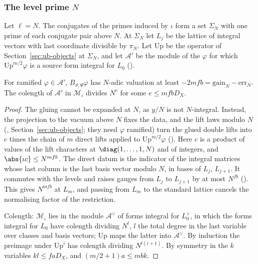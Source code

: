 \subsubsection{The level prime $N$}
Let $\ell=N$. The conjugates of the primes induced by $\iota$ form a set $\Sigma_N$ with one prime of
each conjugate pair above $N$. At $\Sigma_N$ let $L_j$ be the lattice of integral vectors with last
coordinate divisible by $\pi_N$. Let $\mathrm{Up}$ be the operator of Section~\ref{sec:ub-objects} at
$\Sigma_N$, and let $\mathcal A'$ be the module of the $\varphi$ for which
$\mathrm{Up}^{m/2}\varphi$ is a source form integral for $L_0$ ().

\begin{proposition}
\label{ub-divis:prop:N}
For ramified $\varphi\in\mathcal A'$, $B_{\vartheta,\Psi}\varphi$ has $N$-adic valuation at least
$-2mfb=\mathrm{gain}_N-\mathrm{err}_N$. The colength of $\mathcal A'$ in $\mathcal M_\iota$ divides
$N^e$ for some $e\le mfbD_X$.
\end{proposition}

\begin{proof}
The gluing cannot be expanded at $N$, as $y/N$ is not $N$-integral. Instead, the projection to the
vacuum above $N$ fixes the data, and the lift laws modulo $N$ (,
Section~\ref{sec:ub-objects}; they need $\varphi$ ramified) turn the glued double lifts into $c$
times the chain of $m$ direct lifts applied to $\mathrm{Up}^{m/2}\varphi$
(). Here $c$ is a product of
values of the lift characters at $\diag(1,\dots,1,N)$ and of integers, and $\abs{\iota c}\le N^{mfb}$. The direct
datum is the indicator of the integral matrices whose last column is the last basis vector modulo
$N$, in bases of $L_j$, $L_{j+1}$. It commutes with the levels and raises gauges from $L_j$ to
$L_{j+1}$ by at most $N^{fb}$ (). This gives
$N^{mfb}$ at $L_m$, and passing from $L_m$ to the standard lattice cancels the normalising factor of
the restriction.

Colength: $\mathcal M_\iota$ lies in the module $\mathcal A^\vee$ of forms integral for
$L_0^\vee$, in which the forms integral for $L_0$ have colength dividing $N^l$, $l$ the total degree
in the last variable over classes and basis vectors; $\mathrm{Up}$ maps the latter into
$\mathcal A^\vee$. By induction the preimage under $\mathrm{Up}^i$ has colength dividing
$N^{l(i+1)}$. By symmetry in the $k$ variables $kl\le faD_X$, and $(m/2+1)a\le mbk$.
\end{proof}

